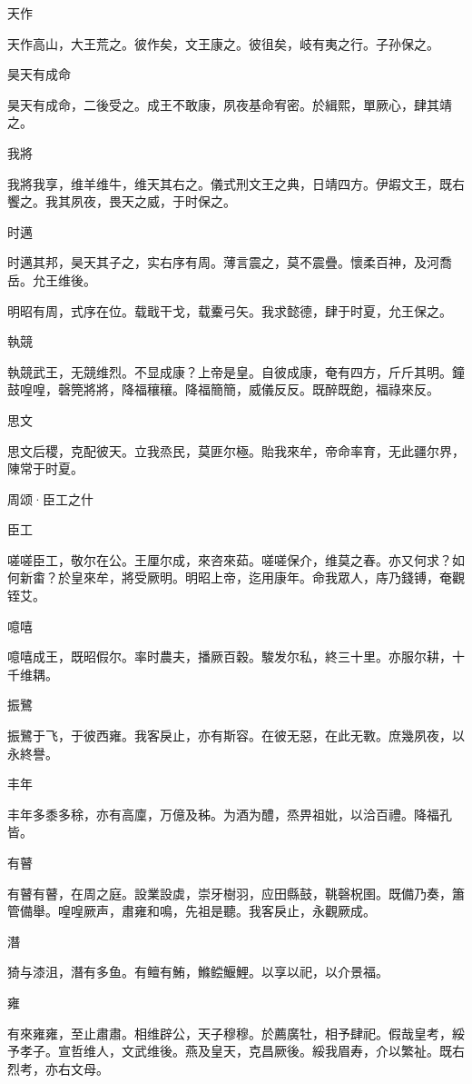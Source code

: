 天作

天作高山，大王荒之。彼作矣，文王康之。彼徂矣，岐有夷之行。子孙保之。

昊天有成命

昊天有成命，二後受之。成王不敢康，夙夜基命宥密。於緝熙，單厥心，肆其靖之。

我將

我將我享，维羊维牛，维天其右之。儀式刑文王之典，日靖四方。伊嘏文王，既右饗之。我其夙夜，畏天之威，于时保之。

时邁

时邁其邦，昊天其子之，实右序有周。薄言震之，莫不震疊。懷柔百神，及河喬岳。允王维後。

明昭有周，式序在位。载戢干戈，载櫜弓矢。我求懿德，肆于时夏，允王保之。

執競

執競武王，无競维烈。不显成康？上帝是皇。自彼成康，奄有四方，斤斤其明。鐘鼓喤喤，磬筦將將，降福穰穰。降福簡簡，威儀反反。既醉既飽，福祿來反。

思文

思文后稷，克配彼天。立我烝民，莫匪尔極。貽我來牟，帝命率育，无此疆尔界，陳常于时夏。




周颂·臣工之什


臣工

嗟嗟臣工，敬尔在公。王厘尔成，來咨來茹。嗟嗟保介，维莫之春。亦又何求？如何新畬？於皇來牟，將受厥明。明昭上帝，迄用康年。命我眾人，庤乃錢镈，奄觀铚艾。

噫嘻

噫嘻成王，既昭假尔。率时農夫，播厥百穀。駿发尔私，終三十里。亦服尔耕，十千维耦。

振鷺

振鷺于飞，于彼西雍。我客戾止，亦有斯容。在彼无惡，在此无斁。庶幾夙夜，以永終譽。

丰年

丰年多黍多稌，亦有高廩，万億及秭。为酒为醴，烝畀祖妣，以洽百禮。降福孔皆。

有瞽

有瞽有瞽，在周之庭。設業設虡，崇牙樹羽，应田縣鼓，鞉磬柷圉。既備乃奏，簫管備舉。喤喤厥声，肅雍和鳴，先祖是聽。我客戾止，永觀厥成。

潛

猗与漆沮，潛有多鱼。有鳣有鮪，鰷鲿鰋鯉。以享以祀，以介景福。

雍

有來雍雍，至止肅肅。相维辟公，天子穆穆。於薦廣牡，相予肆祀。假哉皇考，綏予孝子。宣哲维人，文武维後。燕及皇天，克昌厥後。綏我眉寿，介以繁祉。既右烈考，亦右文母。

